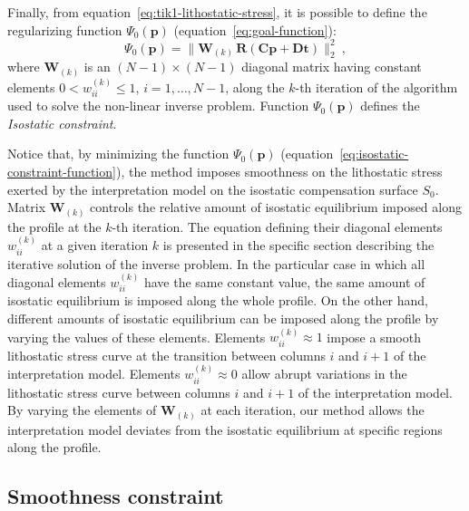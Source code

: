 \documentclass[manuscript]{geophysics}
\begin{document}
Finally, from equation~\ref{eq:tik1-lithostatic-stress}, it is possible to
define the regularizing function $\Psi_{0}(\mathbf{p})$ 
(equation~\ref{eq:goal-function}): 
\begin{equation}
\Psi_{0}(\mathbf{p}) = \| \mathbf{W}_{(k)} \, \mathbf{R} \left( \mathbf{C} \mathbf{p} + \mathbf{D}
\mathbf{t} \right) \|_{2}^{2} \: ,
\label{eq:isostatic-constraint-function}
\end{equation}
where $\mathbf{W}_{(k)}$ is an $(N - 1) \times (N - 1)$ diagonal matrix having constant
elements $0 < w_{ii}^{(k)} \le 1$, $i = 1, \dots, N - 1$, along the $k$-th iteration of the
algorithm used to solve the non-linear inverse problem. 
Function $\Psi_{0}(\mathbf{p})$ defines the \textit{Isostatic constraint}.

Notice that, by minimizing the function $\Psi_{0}(\mathbf{p})$ 
(equation~\ref{eq:isostatic-constraint-function}), the method imposes smoothness on 
the lithostatic stress exerted by the interpretation model on the isostatic 
compensation surface $S_{0}$.
Matrix $\mathbf{W}_{(k)}$ controls the relative amount of isostatic
equilibrium imposed along the profile at the $k$-th iteration. 
The equation defining their diagonal elements $w_{ii}^{(k)}$ at a given iteration $k$ is
presented in the specific section describing the iterative solution of the inverse problem.
In the particular case in which all diagonal elements $w_{ii}^{(k)}$ have the same
constant value, the same amount of isostatic equilibrium is imposed along the 
whole profile. On the other hand, different amounts of isostatic equilibrium
can be imposed along the profile by varying the values of these elements.
Elements $w_{ii}^{(k)} \approx 1$ impose a smooth lithostatic stress curve 
at the transition between columns $i$ and $i+1$ of the interpretation model.
Elements $w_{ii}^{(k)} \approx 0$ allow abrupt variations in the lithostatic stress 
curve between columns $i$ and $i+1$ of the interpretation model.
By varying the elements of $\mathbf{W}_{(k)}$ at each iteration, our method
allows the interpretation model deviates from the isostatic equilibrium 
at specific regions along the profile.


\subsection{Smoothness constraint}
\end{document}
